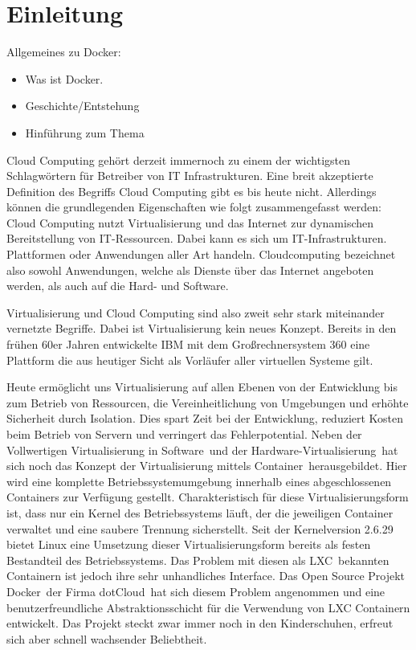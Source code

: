 \chapter{Einleitung}
\label{sec:einleitung}
Allgemeines zu Docker:
\begin{itemize}
    \item Was ist Docker.
    \item Geschichte/Entstehung
    \item Hinführung zum Thema
\end{itemize}

Cloud Computing gehört derzeit immernoch zu einem der wichtigsten Schlagwörtern für Betreiber von IT Infrastrukturen.
\glqq Eine breit akzeptierte Definition des Begriffs Cloud Computing gibt es bis heute nicht. Allerdings können die grundlegenden Eigenschaften wie folgt zusammengefasst werden: Cloud Computing nutzt Virtualisierung und das Internet zur dynamischen Bereitstellung von IT-Ressourcen. Dabei kann es sich um IT-Infrastrukturen. Plattformen oder Anwendungen aller Art handeln. Cloudcomputing bezeichnet also sowohl Anwendungen, welche als Dienste über das Internet angeboten werden, als auch auf die Hard- und Software.\grqq \cite[S. 28]{meinel_virtualisierung_2011}

Virtualisierung und Cloud Computing sind also zweit sehr stark miteinander vernetzte Begriffe.
Dabei ist Virtualisierung kein neues Konzept. Bereits in den frühen 60er Jahren entwickelte IBM mit dem Großrechnersystem 360 eine Plattform die aus heutiger Sicht als Vorläufer aller virtuellen Systeme gilt. \cite{frank_balmes_grin_????}

Heute ermöglicht uns Virtualisierung auf \glqq allen Ebenen von der Entwicklung bis zum Betrieb von Ressourcen, die Vereinheitlichung von Umgebungen und erhöhte Sicherheit durch Isolation. Dies spart Zeit bei der Entwicklung, reduziert Kosten beim Betrieb von Servern und verringert das Fehlerpotential.\grqq \cite[S. 1]{schroder_container-virtualisierung_2014}
Neben der Vollwertigen \grq Virtualisierung in Software\grq\ und der \grq Hardware-Virtualisierung\grq\ hat sich noch das Konzept der \grq Virtualisierung mittels Container\grq\ herausgebildet.
\glqq Hier wird eine komplette Betriebssystemumgebung innerhalb eines abgeschlossenen Containers zur Verfügung gestellt. Charakteristisch für diese Virtualisierungsform ist, dass nur ein Kernel des Betriebssystems läuft, der die jeweiligen Container verwaltet und eine saubere Trennung sicherstellt.\grqq \cite{plotner_linux_2012}
Seit der Kernelversion 2.6.29 \cite{fischer_linux_2014} bietet Linux eine Umsetzung dieser Virtualisierungsform bereits als festen Bestandteil des Betriebssystems.
Das Problem mit diesen als \grq LXC\grq\ bekannten Containern ist jedoch ihre sehr unhandliches Interface.
Das Open Source Projekt \grq Docker\grq\ der Firma \grq dotCloud\grq\ hat sich diesem Problem angenommen und eine benutzerfreundliche Abstraktionsschicht für die Verwendung von LXC Containern entwickelt. Das Projekt steckt zwar immer noch in den Kinderschuhen, erfreut sich aber schnell wachsender Beliebtheit.